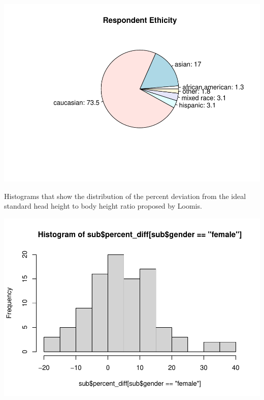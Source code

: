 \documentclass[]{article}
\newenvironment{Shaded}{\begin{snugshade}}{\end{snugshade}}
\newcommand{\DecValTok}[1]{\textcolor[rgb]{0.00,0.00,0.81}{#1}}
\newcommand{\KeywordTok}[1]{\textcolor[rgb]{0.13,0.29,0.53}{\textbf{#1}}}
\newcommand{\NormalTok}[1]{#1}
\newcommand{\OperatorTok}[1]{\textcolor[rgb]{0.81,0.36,0.00}{\textbf{#1}}}
\newcommand{\StringTok}[1]{\textcolor[rgb]{0.31,0.60,0.02}{#1}}
\begin{document}
\includegraphics{project-measure-writeup-student_files/figure-latex/unnamed-chunk-2-1.pdf}

Histograms that show the distribution of the percent deviation from the
ideal standard head height to body height ratio proposed by Loomis.

\begin{Shaded}
\end{Shaded}

\includegraphics{project-measure-writeup-student_files/figure-latex/unnamed-chunk-3-1.pdf}
\end{document}
